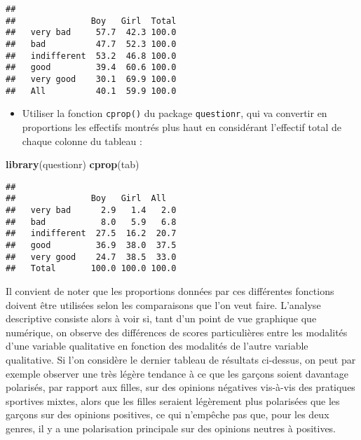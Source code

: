\documentclass[
  french,
]{book}
\newenvironment{Shaded}{\begin{snugshade}}{\end{snugshade}}
\newcommand{\KeywordTok}[1]{\textcolor[rgb]{0.13,0.29,0.53}{\textbf{#1}}}
\newcommand{\NormalTok}[1]{#1}
\providecommand{\tightlist}{%
  \setlength{\itemsep}{0pt}\setlength{\parskip}{0pt}}
\begin{document}
\begin{verbatim}
##              
##               Boy   Girl  Total
##   very bad     57.7  42.3 100.0
##   bad          47.7  52.3 100.0
##   indifferent  53.2  46.8 100.0
##   good         39.4  60.6 100.0
##   very good    30.1  69.9 100.0
##   All          40.1  59.9 100.0
\end{verbatim}

\begin{itemize}
\tightlist
\item
  Utiliser la fonction \texttt{cprop()} du package \texttt{questionr}, qui va convertir en proportions les effectifs montrés plus haut en considérant l'effectif total de chaque colonne du tableau :
\end{itemize}

\begin{Shaded}
\begin{Highlighting}[]
\KeywordTok{library}\NormalTok{(questionr)}
\KeywordTok{cprop}\NormalTok{(tab)}
\end{Highlighting}
\end{Shaded}

\begin{verbatim}
##              
##               Boy   Girl  All  
##   very bad      2.9   1.4   2.0
##   bad           8.0   5.9   6.8
##   indifferent  27.5  16.2  20.7
##   good         36.9  38.0  37.5
##   very good    24.7  38.5  33.0
##   Total       100.0 100.0 100.0
\end{verbatim}

Il convient de noter que les proportions données par ces différentes fonctions doivent être utilisées selon les comparaisons que l'on veut faire. L'analyse descriptive consiste alors à voir si, tant d'un point de vue graphique que numérique, on observe des différences de scores particulières entre les modalités d'une variable qualitative en fonction des modalités de l'autre variable qualitative. Si l'on considère le dernier tableau de résultats ci-dessus, on peut par exemple observer une très légère tendance à ce que les garçons soient davantage polarisés, par rapport aux filles, sur des opinions négatives vis-à-vis des pratiques sportives mixtes, alors que les filles seraient légèrement plus polarisées que les garçons sur des opinions positives, ce qui n'empêche pas que, pour les deux genres, il y a une polarisation principale sur des opinions neutres à positives.
\end{document}
